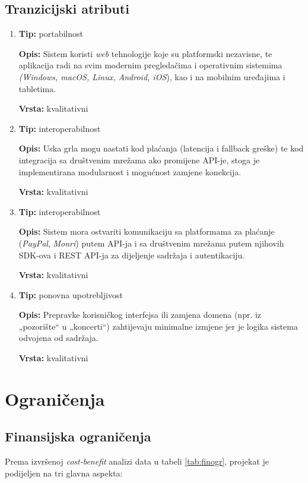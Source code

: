 \sloppy
\subsection{Tranzicijski atributi}

\begin{enumerate}
    \item\textbf{Tip:} portabilnost

    
    \textbf{Opis:} Sistem koristi \textit{web} tehnologije koje su platformski nezavisne, te aplikacija radi na svim modernim pregledačima i operativnim sistemima \textit{(Windows, macOS, Linux, Android, iOS}), kao i na mobilnim uređajima i tabletima.

    
    \textbf{Vrsta:} kvalitativni
    \item\textbf{Tip:} interoperabilnost

    
    \textbf{Opis:} Uska grla mogu nastati kod plaćanja (latencija i fallback greške) te kod integracija sa društvenim mrežama ako promijene API-je, stoga je implementirana modularnost i mogućnost zamjene konekcija.

    
    \textbf{Vrsta:} kvalitativni
    \item\textbf{Tip:} interoperabilnost

    
    \textbf{Opis:} Sistem mora ostvariti komunikaciju sa platformama za plaćanje (\textit{PayPal}, \textit{Monri}) putem API-ja i sa društvenim mrežama putem njihovih SDK-ova i REST API-ja za dijeljenje sadržaja i autentikaciju.

    
    \textbf{Vrsta:} kvalitativni
    \item\textbf{Tip:} ponovna upotrebljivost

    
    \textbf{Opis:} Prepravke korisničkog interfejsa ili zamjena domena (npr. iz „pozorište“ u „koncerti“) zahtijevaju minimalne izmjene jer je logika sistema odvojena od sadržaja.

    
    \textbf{Vrsta:} kvalitativni
\end{enumerate}

\sloppy
\section{Ograničenja}

\sloppy
\subsection{Finansijska ograničenja}

Prema izvršenoj \textit{ cost-benefit} analizi data u tabeli \ref{tab:finogr}, projekat je podijeljen na tri glavna aspekta:

